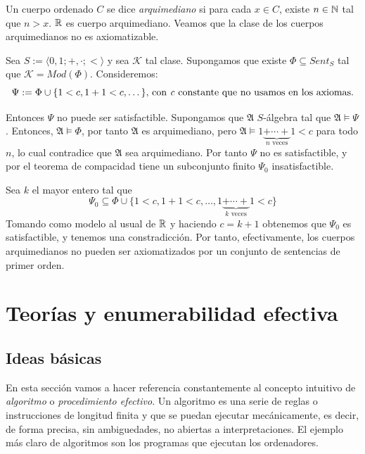 \begin{example}
Un cuerpo ordenado $C$ se dice \textit{arquimediano} si para cada $x \in C$, existe $n \in \mathbb{N}$ tal que $n > x$. $\mathbb{R}$ es cuerpo arquimediano. Veamos que la clase de los cuerpos arquimedianos no es axiomatizable.

Sea $S := \langle 0, 1; +, \cdot; <\rangle$ y sea $\mathcal{K}$ tal clase. Supongamos que existe $\Phi \subseteq Sent_S$ tal que $\mathcal{K} = Mod(\Phi)$. Consideremos:
$$\Psi := \Phi \cup \{1 < c, 1+1<c, \dots\} \text{, con \textit{c} constante que no usamos en los axiomas.}$$

Entonces $\Psi$ no puede ser satisfactible. Supongamos que $\mathfrak{A}$ $S$-álgebra tal que $\mathfrak{A}\vDash \Psi$. Entonces, $\mathfrak{A}\vDash \Phi$, por tanto $\mathfrak{A}$ es arquimediano, pero $\mathfrak{A} \vDash  1  \underbrace{+ \cdots +}_\text{$n$ veces} 1 < c$ para todo $n$, lo cual contradice que $\mathfrak{A}$ sea arquimediano. Por tanto $\Psi$ no es satisfactible, y por el teorema de compacidad tiene un subconjunto finito $\Psi_0$ insatisfactible.

Sea $k$ el mayor entero tal que
$$\Psi_0 \subseteq \Phi \cup \{1 < c,1+1<c, \dots, 1  \underbrace{+ \cdots +}_\text{$k$ veces} 1 < c\}$$
Tomando como modelo al usual de $\mathbb{R}$ y haciendo $c = k+1$ obtenemos que $\Psi_0$ es satisfactible, y tenemos una constradicción. Por tanto, efectivamente, los cuerpos arquimedianos no pueden ser axiomatizados por un conjunto de sentencias de primer orden.
\end{example}


\section{Teorías y enumerabilidad efectiva}\label{teoyenum}

\subsection{Ideas básicas}

En esta sección vamos a hacer referencia constantemente al concepto intuitivo de \textit{algoritmo} o \textit{procedimiento efectivo}. Un algoritmo es una serie de reglas o instrucciones de longitud finita y que se puedan ejecutar mecánicamente, es decir, de forma precisa, sin ambiguedades, no abiertas a interpretaciones. El ejemplo más claro de algoritmos son los programas que ejecutan los ordenadores.\\

